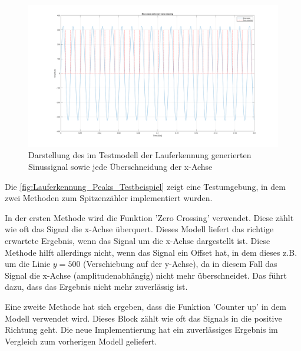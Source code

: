 \begin{figure}[H] %
	\centering
	\includegraphics[width=\linewidth]{Bilder/Lauferkennung_Peaks_SinusSignal.png}
	\caption{Darstellung des im Testmodell der Lauferkennung generierten Sinussignal sowie jede Überschneidung der x-Achse}
	\label{fig:Lauferkennung_Peaks_SinusSignal}
\end{figure}
Die \autoref{fig:Lauferkennung_Peaks_Testbeispiel} zeigt eine Testumgebung, in dem zwei Methoden zum Spitzenzähler implementiert wurden.

In der ersten Methode wird die Funktion 'Zero Crossing' verwendet. Diese zählt wie oft das Signal die x-Achse überquert. Dieses Modell liefert das richtige erwartete Ergebnis, wenn das Signal um die x-Achse dargestellt ist. Diese Methode hilft allerdings nicht, wenn das Signal ein Offset hat, in dem dieses z.B. um die Linie $y = 500$ (Verschiebung auf der y-Achse), da in diesem Fall das Signal die x-Achse (amplitudenabhängig) nicht mehr überschneidet. Das führt dazu, dass das Ergebnis nicht mehr zuverlässig ist.

Eine zweite Methode hat sich ergeben, dass die Funktion 'Counter up' in dem Modell verwendet wird. Dieses Block zählt wie oft das Signals in die positive Richtung geht. Die neue Implementierung hat ein zuverlässiges Ergebnis im Vergleich zum vorherigen Modell geliefert. %

